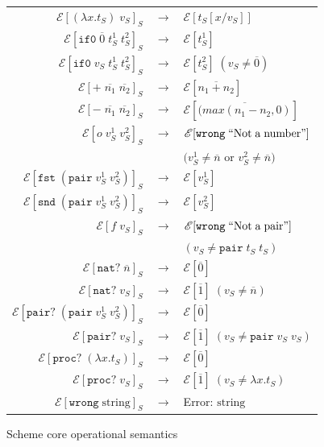 \begin{figure}
\onehalfspacing
\begin{center}
\begin{tabular}{rcl}
$\mathscr{E}[(\lambda x.t_{S})\;v_{S}]_{S}$ & $\rightarrow$ & $\mathscr{E}[t_{S}[x/v_{S}]]$ \\
$\mathscr{E}[\mathtt{if0}\;\overline{0}\;t_{S}^{1}\;t_{S}^{2}]_{S}$ & $\rightarrow$ & $\mathscr{E}[t_{S}^{1}]$ \\
$\mathscr{E}[\mathtt{if0}\;v_{S}\;t_{S}^{1}\;t_{S}^{2}]_{S}$ & $\rightarrow$ & $\mathscr{E}[t_{S}^{2}]\;(v_{S}\neq\overline{0})$ \\
$\mathscr{E}[+\;\overline{n_{1}}\;\overline{n_{2}}]_{S}$ & $\rightarrow$ & $\mathscr{E}[\overline{n_{1}+n_{2}}]$ \\
$\mathscr{E}[-\;\overline{n_{1}}\;\overline{n_{2}}]_{S}$ & $\rightarrow$ & $\mathscr{E}[\overline{(max(n_{1}-n_{2},0)}]$ \\
$\mathscr{E}[o\;v_{S}^{1}\;v_{S}^{2}]_{S}$ & $\rightarrow$ & $\mathscr{E}[\mathtt{wrong}\;\mathrm{``Not\;a\;number"}]$ \\
&& $(v_{S}^{1}\neq\overline{n}$ or $v_{S}^{2}\neq\overline{n})$ \\
$\mathscr{E}[\mathtt{fst}\;(\mathtt{pair}\;v_{S}^{1}\;v_{S}^{2})]_{S}$ & $\rightarrow$ & $\mathscr{E}[v_{S}^{1}]$ \\
$\mathscr{E}[\mathtt{snd}\;(\mathtt{pair}\;v_{S}^{1}\;v_{S}^{2})]_{S}$ & $\rightarrow$ & $\mathscr{E}[v_{S}^{2}]$ \\
$\mathscr{E}[f\;v_{S}]_{S}$ & $\rightarrow$ & $\mathscr{E}[\mathtt{wrong}\;\mathrm{``Not\;a\;pair"}]$ \\
&& $(v_{S}\neq\mathtt{pair}\;t_{S}\;t_{S})$ \\
$\mathscr{E}[\mathtt{nat?}\;\overline{n}]_{S}$ & $\rightarrow$ & $\mathscr{E}[\overline{0}]$ \\
$\mathscr{E}[\mathtt{nat?}\;v_{S}]_{S}$ & $\rightarrow$ & $\mathscr{E}[\overline{1}]\;(v_{S}\neq\overline{n})$ \\
$\mathscr{E}[\mathtt{pair?}\;(\mathtt{pair}\;v_{S}^{1}\;v_{S}^{2})]_{S}$ & $\rightarrow$ & $\mathscr{E}[\overline{0}]$ \\
$\mathscr{E}[\mathtt{pair?}\;v_{S}]_{S}$ & $\rightarrow$ & $\mathscr{E}[\overline{1}]\;(v_{S}\neq\mathtt{pair}\;v_{S}\;v_{S})$ \\
$\mathscr{E}[\mathtt{proc?}\;(\lambda x.t_{S})]_{S}$ & $\rightarrow$ & $\mathscr{E}[\overline{0}]$ \\
$\mathscr{E}[\mathtt{proc?}\;v_{S}]_{S}$ & $\rightarrow$ & $\mathscr{E}[\overline{1}]\;(v_{S}\neq\lambda x.t_{S})$ \\
$\mathscr{E}[\mathtt{wrong}\;\mathrm{string}]_{S}$ & $\rightarrow$ & Error: $\mathrm{string}$
\end{tabular}
\end{center}
\caption{Scheme core operational semantics}
\label{fig:scos}
\end{figure}